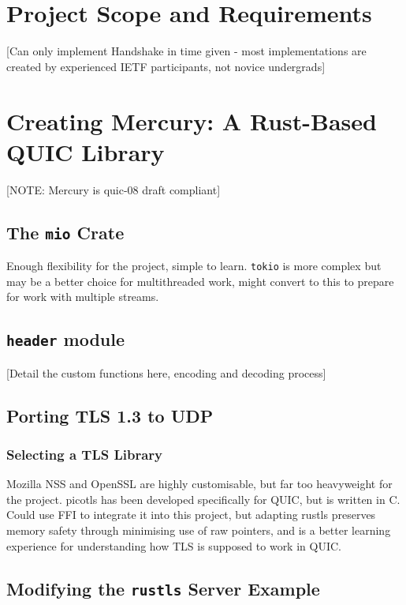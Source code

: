 \documentclass{l4proj}
\begin{document}
\pagebreak


\chapter{Project Scope and Requirements}
[Can only implement Handshake in time given - most implementations are created by experienced IETF participants, not novice undergrads]


\pagebreak


\chapter{Creating Mercury: A Rust-Based QUIC Library}
[NOTE: Mercury is quic-08 draft compliant]

\section{The \texttt{mio} Crate}
Enough flexibility for the project, simple to learn. \texttt{tokio} is more complex but may be a better choice for multithreaded work, might convert to this to prepare for work with multiple streams. 

\section{\texttt{header} module}
[Detail the custom functions here, encoding and decoding process]

\section{Porting TLS 1.3 to UDP}
\subsection{Selecting a TLS Library}
Mozilla NSS and OpenSSL are highly customisable, but far too heavyweight for the project. picotls has been developed specifically for QUIC, but is written in C. Could use FFI to integrate it into this project, but adapting rustls preserves memory safety through minimising use of raw pointers, and is a better learning experience for understanding how TLS is supposed to work in QUIC.

\section{Modifying the \texttt{rustls} Server Example}
\end{document}
